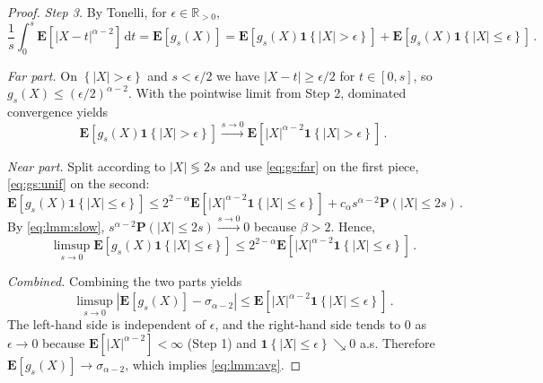 \documentclass{article}
\newcommand{\R}{\mathbb{R}}
\newcommand{\Rpp}{\R_{>0}}
\newcommand{\lcb}{\left\lbrace} %
\newcommand{\rcb}{\right\rbrace} %
\newcommand{\cb}[1]{\lcb #1 \rcb} %
\newcommand{\lab}{\left[} %
\newcommand{\rab}{\right]} %
\newcommand{\ab}[1]{\lab #1 \rab} %
\newcommand{\abOf}[1]{\!\ab{#1}} %
\newcommand{\absOf}[1]{\left\vert #1 \right\vert} %
\renewcommand{\Pr}{\mathbf{P}} %
\newcommand{\Prof}[1]{\Pr(#1)}
\newcommand{\E}{\mathbf{E}} %
\newcommand{\Eof}[1]{\E[#1]}
\newcommand{\EOf}[1]{\E\abOf{#1}}
\newcommand{\eqfs}{\,.}
\newcommand{\dl}{\mathrm{d}} %
\begin{document}
\begin{proof}
    \emph{Step 3.}
    By Tonelli,  for $\epsilon\in\Rpp$,
    \begin{equation}
        \frac1{s}\int_{0}^s \EOf{|X-t|^{\alpha-2}}\,\dl t
        =
        \Eof{g_s(X)}
        =
        \Eof{g_s(X)\mathbf 1\cb{|X|>\epsilon}}+\Eof{g_s(X)\mathbf 1\cb{|X|\le\epsilon}}
        \eqfs
    \end{equation}
   
    \emph{Far part.} On $\cb{|X|>\epsilon}$ and $s<\epsilon/2$ we have
    $|X-t|\ge\epsilon/2$ for $t\in[0,s]$, so
    $g_s(X)\le(\epsilon/2)^{\alpha-2}$. With the pointwise limit
    from Step 2, dominated convergence yields
    \begin{equation}
        \Eof{g_s(X)\mathbf 1\cb{|X|>\epsilon}}
        \xrightarrow{s\to0}
        \Eof{|X|^{\alpha-2}\mathbf 1\cb{|X|>\epsilon}}
        \eqfs
    \end{equation}
    
    \emph{Near part.} Split according to $|X|\lessgtr2s$ and use
    \eqref{eq:gs:far} on the first piece, \eqref{eq:gs:unif} on the second:
    \begin{equation}
        \Eof{g_s(X)\mathbf 1\cb{|X|\le\epsilon}}
        \le
        2^{2-\alpha} \Eof{|X|^{\alpha-2}\mathbf 1\cb{|X|\le\epsilon}}
        +
        c_\alpha s^{\alpha-2} \Prof{|X|\leq 2s}
        \eqfs
    \end{equation}
    By \eqref{eq:lmm:slow}, $s^{\alpha-2}\Prof{|X|\leq 2s}\xrightarrow{s\to0}0$ because $\beta>2$. Hence,
    \begin{equation}
        \limsup_{s\to0}\Eof{g_s(X)\mathbf 1\cb{|X|\le\epsilon}}
        \le
        2^{2-\alpha}\Eof{|X|^{\alpha-2}\mathbf 1\cb{|X|\le\epsilon}}
        \eqfs
    \end{equation}
    
    \emph{Combined.}
    Combining the two parts yields
    \begin{equation}
        \limsup_{s\to0}\absOf{\Eof{g_s(X)} - \sigma_{\alpha-2}}
        \le
        \Eof{|X|^{\alpha-2}\mathbf 1\cb{|X|\le\epsilon}}
        \eqfs
    \end{equation}
    The left-hand side is independent of $\epsilon$, and the right-hand side
    tends to $0$ as $\epsilon\to0$ because $\Eof{|X|^{\alpha-2}}<\infty$ (Step 1)
    and $\mathbf 1\cb{|X|\le\epsilon}\searrow0$ a.s. Therefore
    $\Eof{g_s(X)}\to\sigma_{\alpha-2}$, which implies \eqref{eq:lmm:avg}.
\end{proof}
\end{document}
